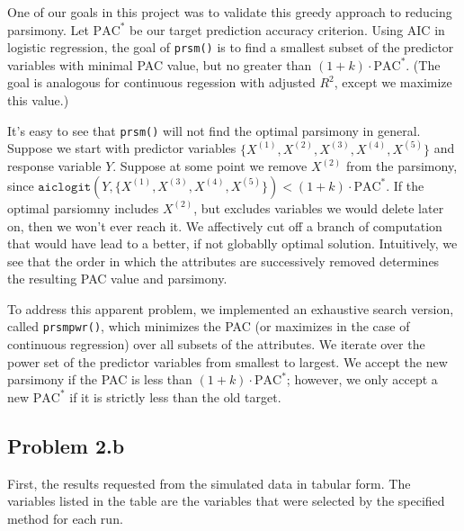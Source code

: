 \documentclass[letter]{article}
\begin{document}
One of our goals in this project was to validate this greedy approach to reducing parsimony. 
Let $\text{PAC}^*$ be our target prediction accuracy criterion. Using AIC in logistic regression,
the goal of \texttt{prsm()} is to find a smallest subset of the predictor variables with minimal
PAC value, but no greater than $(1+k)\cdot\text{PAC}^*$. (The goal is analogous for continuous regession 
with adjusted $R^2$, except we maximize this value.) 

It's easy to see that \texttt{prsm()} will not find
the optimal parsimony in general. Suppose we start with predictor variables 
$\{X^{(1)}, X^{(2)}, X^{(3)}, X^{(4)}, X^{(5)}\}$ 
and response variable $Y$. Suppose at some point we remove $X^{(2)}$ from the parsimony,
since $\texttt{aiclogit}(Y, \{X^{(1)}, X^{(3)}, X^{(4)}, X^{(5)}\}) < (1+k)\cdot\text{PAC}^*$.  
If the optimal parsiomny includes $X^{(2)}$, but excludes variables we would delete later on, 
then we won't ever reach it. We affectively cut off a branch of computation that would have 
lead to a better, if not globablly optimal solution. Intuitively, we see that the order in 
which the attributes are successively removed determines the resulting PAC value and 
parsimony.

To address this apparent problem, we implemented an exhaustive search version, called 
\texttt{prsmpwr()}, which minimizes the PAC (or maximizes in the case of continuous 
regression) over all subsets of the attributes. We iterate over the power set of the 
predictor variables from smallest to largest. We accept the new parsimony if the PAC
is less than $(1+k)\cdot\text{PAC}^*$; however, we only accept a new $\text{PAC}^*$  
if it is strictly less than the old target.











%


\subsection*{Problem 2.b}

First, the results requested from the simulated data in tabular form. The variables listed in the table are the variables that were selected by the specified method for each run.
\end{document}
